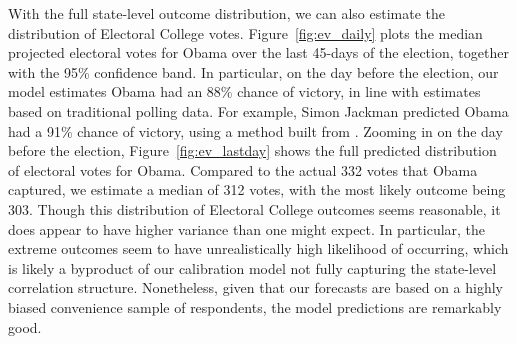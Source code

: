 \documentclass[preprint,authoryear,12pt]{elsarticle}
\begin{document}
With the full state-level outcome distribution, we can also estimate the distribution of Electoral College votes.
Figure~\ref{fig:ev_daily} plots the median projected electoral votes for Obama over the last 45-days of the election,
together with the 95\% confidence band.
In particular, on the day before the election, our model estimates Obama had an 88\% chance
of victory, in line with estimates based on traditional polling data. For example, Simon Jackman predicted Obama had a 91\% chance of victory, using a method built from \citet{jackman2005pooling}.
Zooming in on the day before the election, Figure~\ref{fig:ev_lastday} shows the
full predicted distribution of electoral votes for Obama.  Compared to the
actual 332 votes that Obama captured, we estimate a median of 312 votes, with the
most likely outcome being 303. Though this distribution of Electoral College
outcomes seems reasonable, it does appear to have higher variance than one might
expect. In particular, the extreme outcomes seem to have unrealistically high
likelihood of occurring, which is likely a byproduct of our calibration model
not fully capturing the state-level correlation structure.  Nonetheless, given
that our forecasts are based on a highly biased convenience sample of
respondents, the model predictions are remarkably good.

\end{document}
